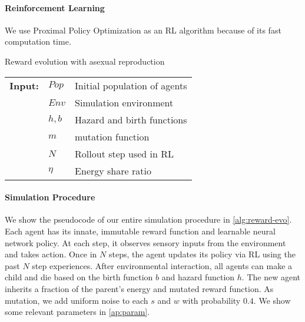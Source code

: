 \paragraph{Reinforcement Learning}
We use Proximal Policy Optimization \citep{schulmanProximalPolicyOptimization2017} as an RL algorithm because of its fast computation time.

\begin{algorithm}
  \caption{Reward evolution with asexual reproduction}\label{alg:reward-evo}
  \begin{tabular}{lll}
    \textbf{Input:} & $Pop$ & Initial population of agents \\
                    & $Env$ & Simulation environment \\
                    & $h, b$ & Hazard and birth functions \\
                    & $m$ & mutation function \\
                    & $N$ & Rollout step used in RL \\
                    & $\eta$ & Energy share ratio
  \end{tabular}
  \begin{algorithmic}[1]
    \Loop{}
      \EndOnce{}
    \EndFor{}
       
      \EndWith{}
       
      \EndWith{}
    \EndFor{}
  \EndLoop{}
\end{algorithmic}
\end{algorithm}

\paragraph{Simulation Procedure}
We show the pseudocode of our entire simulation procedure in \cref{alg:reward-evo}. Each agent has its innate, immutable reward function and learnable neural network policy. At each step, it observes sensory inputs from the environment and takes action. Once in $N$ steps, the agent updates its policy via RL using the past $N$ step experiences. After environmental interaction, all agents can make a child and die based on the birth function $b$ and hazard function $h$. The new agent inherits a fraction of the parent's energy and mutated reward function. As mutation, we add uniform noise to each $s$ and $w$ with probability $0.4$. We show some relevant parameters in \cref{ap:param}.

